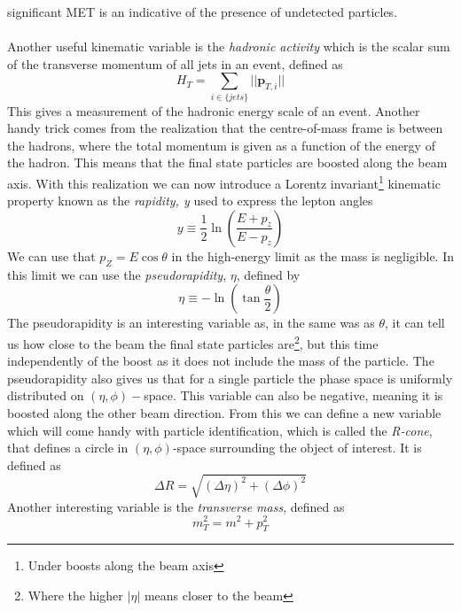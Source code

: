 \documentclass[12pt, a4paper]{book}
\begin{document}
significant MET is an indicative of the presence of undetected particles. \\
\\Another useful kinematic variable is the \textit{hadronic activity} which is the scalar sum of the transverse momentum of all jets in an event, defined as
\begin{equation}\label{eq:HT}
    H_T = \sum_{i\in\{jets\}} \vert\vert \mathbf{p}_{T,i}\vert\vert
\end{equation}
This gives a measurement of the hadronic energy scale of an event. Another handy trick comes from the realization that the centre-of-mass frame is between the hadrons, where the total momentum is given as a function of the energy of the hadron. 
This means that the final state particles are boosted along the beam axis. With this realization we can now introduce a Lorentz invariant\footnote{Under boosts along the beam axis} kinematic property known as the \textit{rapidity, y} used to express the lepton angles
\begin{equation}\label{eq:rapidity}
    y \equiv \frac{1}{2}\ln\left(\frac{E+p_z}{E-p_z}\right)  
\end{equation} 
We can use that $p_Z = E\cos\theta$ in the high-energy limit as the mass is negligible. In this limit we can use the \textit{pseudorapidity}, $\eta$, defined by
\begin{equation}\label{eq:pseudorapidity}
    \eta \equiv -\ln\left(\tan\frac{\theta}{2}\right)
\end{equation}
The pseudorapidity is an interesting variable as, in the same was as $\theta$, it can tell us how close to the beam the final state particles are\footnote{Where the higher $\vert\eta\vert$ means closer to the beam}, but this time independently of the boost as it does not include the mass of the particle. The
pseudorapidity also gives us that for a single particle the phase space is uniformly distributed on $(\eta,\phi)-$space. This variable can also be negative, meaning it is boosted along the other beam direction. 
From this we can define a new variable which will come handy with particle identification, which is called the \textit{R-cone}, that defines a circle in $(\eta,\phi)$-space surrounding the object of interest. It is defined as
\begin{equation}\label{eq:R-cone}
    \Delta R = \sqrt{(\Delta\eta)^2+(\Delta\phi)^2}
\end{equation}
Another interesting variable is the \textit{transverse mass}, defined as
\begin{equation}\label{eq:transverse_mass}
    m_T^2 = m^2 + p_T^2
\end{equation}
\end{document}
